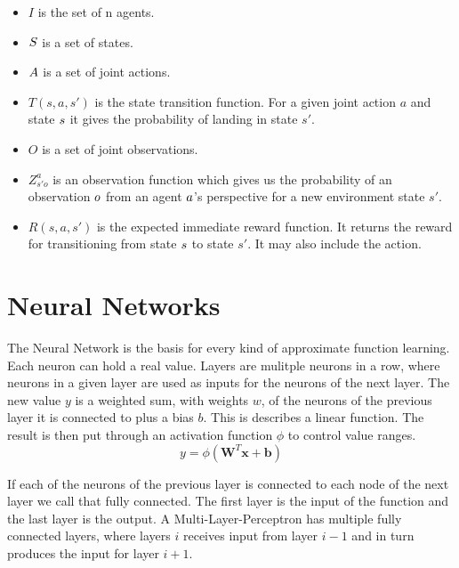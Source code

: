 \begin{itemize}[noitemsep,nolistsep]
	\item $I$ is the set of n agents.
	\item $S$ is a set of states.
	\item $A$ is a set of joint actions.
	\item $T(s, a, s')$ is the state transition function. For a given joint action $a$ and state $s$ it gives the probability of landing in state $s'$.
	\item $O$ is a set of joint observations.
	\item $Z_{s'o}^a$ is an observation function which gives us the probability of an observation $o$ from an agent $a$'s perspective for a new environment state $s'$.
	\item $R(s,a,s')$ is the expected immediate reward function. It returns the reward for transitioning from state $s$ to state $s'$. It may also include the action.
\end{itemize}

\section{Neural Networks}
The Neural Network is the basis for every kind of approximate function learning. Each neuron can hold a real value. Layers are mulitple neurons in a row, where neurons in a given layer are used as inputs for the neurons of the next layer. The new value $y$ is a weighted  sum, with weights $w$, of the neurons of the previous layer it is connected to plus a bias $b$. This is describes a linear function. The result is then put through an activation function $\phi$ to control value ranges.
\begin{equation}
    y = \phi(\textbf{W}^T \textbf{x} + \textbf{b}) \nonumber
\end{equation} 

If each of the neurons of the previous layer is connected to each node of the next layer we call that fully connected. The first layer is the input of the function and the last layer is the output. A Multi-Layer-Perceptron has multiple fully connected layers, where layers $i$ receives input from layer $i-1$ and in turn produces the input for layer $i+1$.


